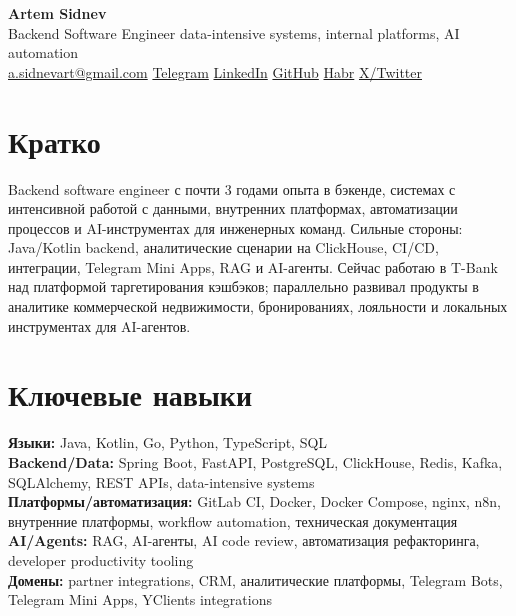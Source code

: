 \documentclass[10pt,a4paper]{article}
\begin{document}
\small

\begin{center}
{\LARGE \textbf{Artem Sidnev}}\\[0.20em]
{\normalsize Backend Software Engineer \textbar{} data-intensive systems, internal platforms, AI automation}\\[0.35em]
{\footnotesize
\href{mailto:a.sidnevart@gmail.com}{a.sidnevart@gmail.com}
\enspace\textbar\enspace
\href{https://t.me/sidnevart}{Telegram}
\enspace\textbar\enspace
\href{https://www.linkedin.com/in/artem-sidnev}{LinkedIn}
\enspace\textbar\enspace
\href{https://github.com/sidnevart}{GitHub}
\enspace\textbar\enspace
\href{https://habr.com/ru/users/sidnevart/}{Habr}
\enspace\textbar\enspace
\href{https://x.com/ArtemkaWeb3}{X/Twitter}
}
\end{center}

\vspace{0.04em}

\section*{Кратко}
Backend software engineer с почти 3 годами опыта в бэкенде, системах с интенсивной работой с данными, внутренних платформах, автоматизации процессов и AI-инструментах для инженерных команд. Сильные стороны: Java/Kotlin backend, аналитические сценарии на ClickHouse, CI/CD, интеграции, Telegram Mini Apps, RAG и AI-агенты. Сейчас работаю в T-Bank над платформой таргетирования кэшбэков; параллельно развивал продукты в аналитике коммерческой недвижимости, бронированиях, лояльности и локальных инструментах для AI-агентов.

\section*{Ключевые навыки}
\textbf{Языки:} Java, Kotlin, Go, Python, TypeScript, SQL \\
\textbf{Backend/Data:} Spring Boot, FastAPI, PostgreSQL, ClickHouse, Redis, Kafka, SQLAlchemy, REST APIs, data-intensive systems \\
\textbf{Платформы/автоматизация:} GitLab CI, Docker, Docker Compose, nginx, n8n, внутренние платформы, workflow automation, техническая документация \\
\textbf{AI/Agents:} RAG, AI-агенты, AI code review, автоматизация рефакторинга, developer productivity tooling \\
\textbf{Домены:} partner integrations, CRM, аналитические платформы, Telegram Bots, Telegram Mini Apps, YClients integrations
\end{document}

